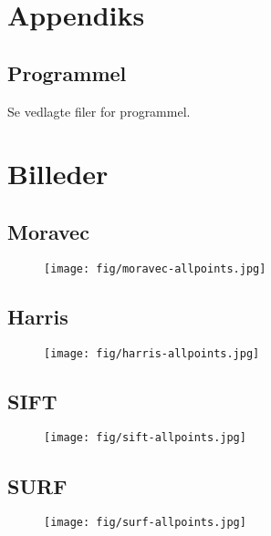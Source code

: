 \chapter{Appendiks}
\section{Programmel}
Se vedlagte filer for programmel.
\chapter{Billeder}
\section{Moravec}
\begin{figure}[H]
    \centering
    \texttt{[image: fig/moravec-allpoints.jpg]}
     \vspace{-0.5em}
    \begin{center}    
     \end{center}
     \vspace{-3em}
  \end{figure} \noindent
\section{Harris}
\begin{figure}[H]
    \centering
    \texttt{[image: fig/harris-allpoints.jpg]}
     \vspace{-0.5em}
    \begin{center}    
     \end{center}
     \vspace{-3em}
  \end{figure} \noindent
\section{SIFT}
\begin{figure}[H]
    \centering
    \texttt{[image: fig/sift-allpoints.jpg]}
     \vspace{-0.5em}
    \begin{center}    
     \end{center}
     \vspace{-3em}
  \end{figure} \noindent
\section{SURF}
\begin{figure}[H]
    \centering
    \texttt{[image: fig/surf-allpoints.jpg]}
     \vspace{-0.5em}
    \begin{center}    
    \label{fig:difference}
     \end{center}
     \vspace{-3em}
  \end{figure} \noindent